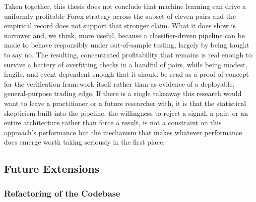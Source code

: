 \documentclass[12pt, a4paper]{article}
\begin{document}
Taken together, this thesis does not conclude that machine learning can drive a uniformly profitable Forex strategy across the subset of eleven pairs and the empirical record does 
not support that stronger claim. What it does show is narrower and, we think, more useful, because a classifier-driven pipeline can be made to behave responsibly under out-of-sample 
testing, largely by being taught to say no. The resulting, concentrated profitability that remains is real enough to survive a battery of overfitting checks in a handful of 
pairs, while being modest, fragile, and event-dependent enough that it should be read as a proof of concept for the verification framework itself rather than as evidence of a 
deployable, general-purpose trading edge. If there is a single takeaway this research would want to leave a practitioner or a future researcher with, it is that the statistical 
skepticism built into the pipeline, the willingness to reject a signal, a pair, or an entire architecture rather than force a result, is not a constraint on this approach's 
performance but the mechanism that makes whatever performance does emerge worth taking seriously in the first place.


\subsection{Future Extensions}

\subsubsection{Refactoring of the Codebase}
\end{document}
